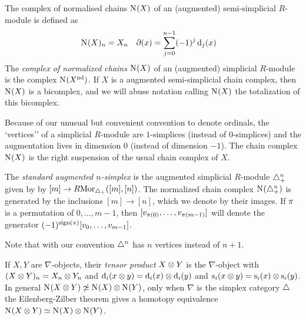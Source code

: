 
The complex of normalised chains $\operatorname{N}_{}(X)$ of an (augmented) semi-simplicial $R$-module is defined as
\begin{align*}
	\operatorname{N}_{}(X)_n &= X_n
	&
	\partial(x) &= \sum_{j=0}^{n-1} (-1)^j \operatorname{d}_j(x)
\end{align*}
The \emph{complex of normalized chains} $\operatorname{N}_{}(X)$ of an (augmented) simplicial $R$-module is the complex $\operatorname{N}_{}(X^{\mathrm{nd}})$. If $X$ is a augmented semi-simplicial chain complex, then $\operatorname{N}_{}(X)$ is a bicomplex, and we will abuse notation calling $\operatorname{N}_{}(X)$ the totalization of this bicomplex.


\begin{warning}
	Because of our unusual but convenient convention to denote ordinals, the `vertices'' of a simplicial $R$-module are $1$-simplices (instead of $0$-simplices) and the augmentation lives in dimension $0$ (instead of dimension $-1$). The chain complex $\operatorname{N}_{}(X)$ is the right suspension of the usual chain complex of $X$.
\end{warning}



The \emph{standard augmented $n$-simplex} is the augmented simplicial $R$-module $\triangle^n_+$ given by by $[m] \to R\mathrm{Mor}_{\triangle_{+}}([m],[n])$. The normalized chain complex $\operatorname{N}_{}(\triangle_{+}^n)$ is generated by the inclusions $[m] \to [n]$, which we denote by their images. If $\pi$ is a permutation of $0,\dots,m-1$, then $[v_{\pi(0)},\dots,v_{\pi(m-1)}]$ will denote the generator $(-1)^{\operatorname{sign}(\pi)}[v_0,\dots,v_{m-1}]$.

\begin{warning}
	 Note that with our convention $\triangle^n$ has $n$ vertices instead of $n+1$.
\end{warning}

If $X,Y$ are $\nabla$-objects, their \emph{tensor product} $X\otimes Y$ is the $\nabla$-object with $(X\otimes Y)_n = X_n\otimes Y_n$ and $\operatorname{d}_i(x\otimes y) = \operatorname{d}_i(x)\otimes \operatorname{d}_i(y)$ and $\operatorname{s}_i(x\otimes y) = \operatorname{s}_i(x)\otimes \operatorname{s}_i(y)$. In general $\operatorname{N}_{}(X\otimes Y)\not\simeq \operatorname{N}_{}(X)\otimes \operatorname{N}_{}(Y)$, only when $\nabla$ is the simplex category $\triangle$ the Eilenberg-Zilber theorem gives a homotopy equivalence $\operatorname{N}_{}(X\otimes Y)\simeq \operatorname{N}_{}(X)\otimes \operatorname{N}_{}(Y)$.


